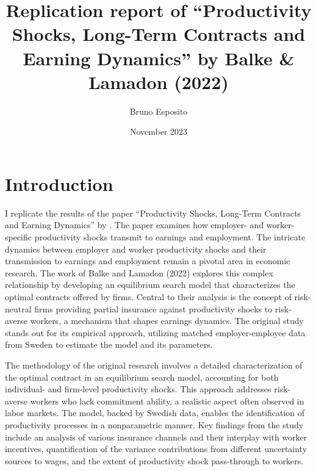 \documentclass{article}
\title{Replication report of ``Productivity Shocks, Long-Term Contracts and Earning Dynamics'' by Balke \& Lamadon (2022)}
\author{Bruno Esposito}
\date{November 2023}
\begin{document}
\maketitle

\section{Introduction}

I replicate the results of the paper ``Productivity Shocks, Long-Term Contracts and Earning Dynamics'' by \cite{balke2022productivity}. The paper examines how employer- and worker-specific productivity shocks transmit to earnings and employment. The intricate dynamics between employer and worker productivity shocks and their transmission to earnings and employment remain a pivotal area in economic research. The work of Balke and Lamadon (2022) explores this complex relationship by developing an equilibrium search model that characterizes the optimal contracts offered by firms. Central to their analysis is the concept of risk-neutral firms providing partial insurance against productivity shocks to risk-averse workers, a mechanism that shapes earnings dynamics. The original study stands out for its empirical approach, utilizing matched employer-employee data from Sweden to estimate the model and its parameters.

The methodology of the original research involves a detailed characterization of the optimal contract in an equilibrium search model, accounting for both individual- and firm-level productivity shocks. This approach addresses risk-averse workers who lack commitment ability, a realistic aspect often observed in labor markets. The model, backed by Swedish data, enables the identification of productivity processes in a nonparametric manner. Key findings from the study include an analysis of various insurance channels and their interplay with worker incentives, quantification of the variance contributions from different uncertainty sources to wages, and the extent of productivity shock pass-through to workers. 
\end{document}
